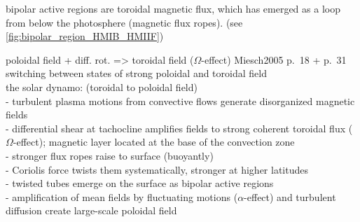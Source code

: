 bipolar active regions are toroidal magnetic flux, which has emerged as a loop from below the photosphere (magnetic flux ropes). (see \autoref{fig:bipolar_region_HMIB_HMIIF})\\
\begin{figure}[htb]
\end{figure}

poloidal field + diff. rot. => toroidal field ($\Omega$-effect) Miesch2005 p.~18 + p.~31\\
switching between states of strong poloidal and toroidal field\\

the solar dynamo: (toroidal to poloidal field)\\
- turbulent plasma motions from convective flows generate disorganized magnetic fields\\
- differential shear at tachocline amplifies fields to strong coherent toroidal flux ($\Omega$-effect); magnetic layer located at the base of the convection zone\\
- stronger flux ropes raise to surface (buoyantly)\\
- Coriolis force twists them systematically, stronger at higher latitudes\\
- twisted tubes emerge on the surface as bipolar active regions\\
- amplification of mean fields by fluctuating motions ($\alpha$-effect) and turbulent diffusion create large-scale poloidal field\\


